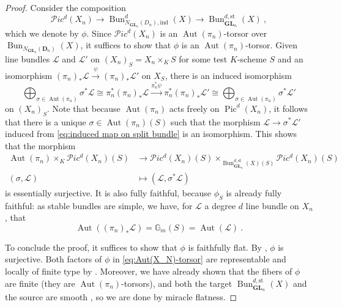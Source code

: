 \documentclass[10pt, a4paper]{amsart}
\theoremstyle{definition}
\theoremstyle{myitemstyle}
\newcommand{\G}{\mathbb{G}}
\newcommand{\bfD}{\mathbf{D}}
\newcommand{\bGL}{\mathbf{GL}}
\newcommand{\mc}[1]{{\mathcal{#1}}}
\DeclareMathOperator{\Pic}{Pic}
\DeclareMathOperator{\Aut}{Aut}
\DeclareMathOperator{\Bun}{Bun}
\newcommand{\mPic}{\mathcal Pic}
\newcommand{\st}{\mathrm{st}}
\newcommand{\ind}{\mathrm{ind}}
\begin{document}
\begin{proof}
    Consider the composition
    \begin{equation}
    \label{eq:Aut(X_N)-torsor}
    \mPic^d(X_n)\longrightarrow \Bun_{N_{\bGL_n}(D_n),\ind}^{d}(X)\longrightarrow \Bun_{\bGL_n}^{d,\st}(X) \ , 
    \end{equation}
    which we denote by $\phi$. Since $\mPic^d(X_n)$ is an $\Aut(\pi_n)$-torsor over $\Bun_{N_{\bGL_n}(\bfD_n)}(X)$, it suffices to show that $\phi$ is an $\Aut(\pi_n)$-torsor. Given line bundles $\mc L$ and $\mc L'$ on $(X_n)_S=X_n\times_K S$ for some test $K$-scheme $S$ and an isomorphism $(\pi_n)_*\mc L\xrightarrow{\psi} (\pi_n)_*\mc L'$ on $X_S$, there is an induced isomorphism 
    \begin{equation}
    \label{eq:induced map on split bundle}
    \bigoplus_{\sigma\in \Aut(\pi_n)} \sigma^*\mc L\cong \pi_n^*(\pi_n)_*\mc L\xrightarrow{\pi_n^*\psi} \pi_n^*(\pi_n)_*\mc L'\cong \bigoplus_{\sigma\in \Aut(\pi_n)} \sigma^*\mc L'    
    \end{equation}
    on $(X_n)_S$.  Note that because $\Aut(\pi_n)$ acts freely on $\Pic^d(X_n)$, it follows that there is a unique $\sigma\in \Aut(\pi_n)(S)$ such that the morphism $\mc L\to \sigma^*\mc L'$ induced from \eqref{eq:induced map on split bundle} is an isomorphism. This shows that the morphism
    \begin{equation*}\begin{split}
    \Aut(\pi_n) \times _K \mPic^d(X_n)(S) &\longrightarrow \mPic^d(X_n)(S)\times_{\Bun_{\bGL_n}^{d,\st}(X)(S)} \mPic^d(X_n)(S) \\ (\sigma, \mc L)&\longmapsto (\mc L, \sigma^*\mc L)
    \end{split}\end{equation*}
    is essentially surjective. It is also fully faithful, because $\phi_S$ is already fully faithful: as stable bundles are simple, we have, for $\mc L$ a degree $d$ line bundle on $X_n$, that 
    \[
    \Aut((\pi_n)_*\mc L)=\G_m(S) =\Aut(\mc L) \ .
    \]

    To conclude the proof, it suffices to show that $\phi$ is faithfully flat. By \cite[Theorem 7.1]{2022GrossUlirschZakharov}, $\phi$ is surjective. Both factors of $\phi$ in  \eqref{eq:Aut(X_N)-torsor} are representable and locally of finite type by \cite[Fact 2.3]{Hoffmann}. Moreover, we have already shown that the fibers of $\phi$ are finite (they are $\Aut(\pi_n)$-torsors), and both the target $\Bun^{d,\st}_{\bGL_n}(X)$ and the source are smooth \cite[Proposition 4.1]{Hoffmann}, so we are done by miracle flatness. 
    \end{proof}
    
\end{document}
